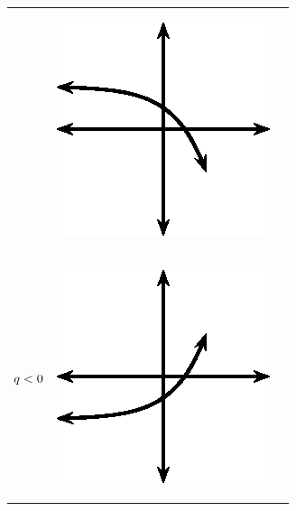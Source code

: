 \begin{center}
\begin{xtabular*}{\mytablewidth}[t]{|p{10\mystarwidth}|p{10\mystarwidth}|p{10\mystarwidth}|}
                 &
    \setcounter{subfigure}{0}
\label{m39348*id250558}
    \begin{center}
    \label{m39348*id250558!!!underscore!!!media}\label{m39348*id250558!!!underscore!!!printimage}\includegraphics[width=.3\columnwidth]{col11306.imgs/m39348_MG10C11_029.png} %
      \vspace{2pt}
    \vspace{.1in}
    \end{center}    
     \tabularnewline{}
                  $q<{}0$
                 &
    \setcounter{subfigure}{0}
\label{m39348*id250596}
    \begin{center}
    \label{m39348*id250596!!!underscore!!!media}\label{m39348*id250596!!!underscore!!!printimage}\includegraphics[width=.3\columnwidth]{col11306.imgs/m39348_MG10C11_030.png} %
      \vspace{2pt}
    \vspace{.1in}
    \end{center}    

\end{xtabular*}
\end{center}
